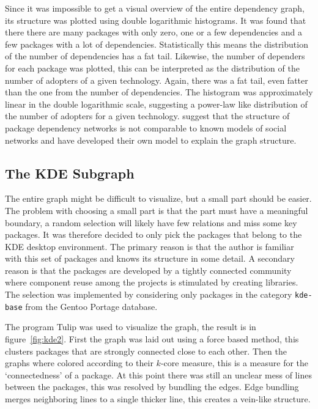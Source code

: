 \documentclass[smallextended,final]{svjour3}
\begin{document}
Since it was impossible to get a visual overview of the entire dependency graph, its structure was plotted using double logarithmic histograms. It was found that there there are many packages with only zero, one or a few dependencies and a few packages with a lot of dependencies. Statistically this means the distribution of the number of dependencies has a fat tail. Likewise, the number of dependers for each package was plotted, this can be interpreted as the distribution of the number of adopters of a given technology. Again, there was a fat tail, even fatter than the one from the number of dependencies. The histogram was approximately linear in the double logarithmic scale, suggesting a power-law like distribution of the number of adopters for a given technology. \citet{zheng08} suggest that the structure of package dependency networks is not comparable to known models of social networks and have developed their own model to explain the graph structure.

\subsection{The KDE Subgraph}

The entire graph might be difficult to visualize, but a small part should be easier. The problem with choosing a small part is that the part must have a meaningful boundary, a random selection will likely have few relations and miss some key packages. It was therefore decided to only pick the packages that belong to the KDE desktop environment. The primary reason is that the author is familiar with this set of packages and knows its structure in some detail. A secondary reason is that the packages are developed by a tightly connected community where component reuse among the projects is stimulated by creating libraries. The selection was implemented by considering only packages in the category \verb|kde-base| from the Gentoo Portage database.

The program Tulip was used to visualize the graph, the result is in figure~\ref{fig:kde2}. First the graph was laid out using a force based method, this clusters packages that are strongly connected close to each other. Then the graphs where colored according to their $k$-core measure, this is a measure for the `connectedness' of a package. At this point there was still an unclear mess of lines between the packages, this was resolved by bundling the edges. Edge bundling merges neighboring lines to a single thicker line, this creates a vein-like structure. 
\end{document}
